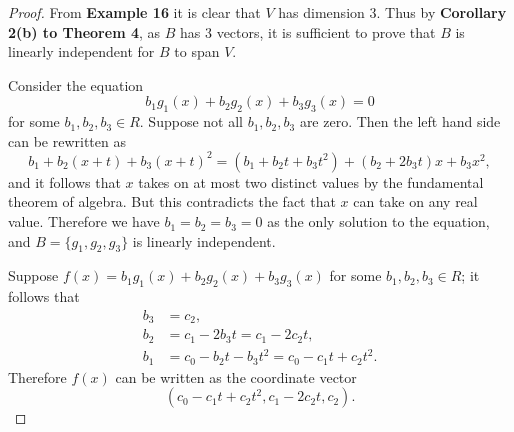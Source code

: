 \documentclass{article}
\begin{document}
\begin{proof}
  From \textbf{Example 16} it is clear that $V$ has dimension 3. Thus by
  \textbf{Corollary 2(b) to Theorem 4}, as $B$ has 3 vectors, it is sufficient
  to prove that $B$ is linearly independent for $B$ to span $V$.

  Consider the equation \[
    b_1g_1(x) + b_2g_2(x) + b_3g_3(x) = 0
  \] for some $b_1, b_2, b_3 \in R$. Suppose not all $b_1, b_2, b_3$ are zero.
  Then the left hand side can be rewritten as \[
    b_1 + b_2(x + t) + b_3(x + t)^2 = (b_1 + b_2t + b_3t^2) + (b_2 + 2b_3t)x +
    b_3x^2,
  \] and it follows that $x$ takes on at most two distinct values by the
  fundamental theorem of algebra. But this contradicts the fact that $x$ can
  take on any real value. Therefore we have $b_1 = b_2 = b_3 = 0$ as the only
  solution to the equation, and $B = \{g_1, g_2, g_3\}$ is linearly independent.

  Suppose $f(x) = b_1g_1(x) + b_2g_2(x) + b_3g_3(x)$ for some $b_1, b_2, b_3 \in
  R$; it follows that
  \begin{align*}
    b_3 &= c_2, \\
    b_2 &= c_1 - 2b_3t = c_1 - 2c_2t, \\
    b_1 &= c_0 - b_2t - b_3t^2 = c_0 - c_1t + c_2t^2.
  \end{align*}
  Therefore $f(x)$ can be written as the coordinate vector \[
    (c_0 - c_1t + c_2t^2, c_1 - 2c_2t, c_2).
  \]
\end{proof}
\end{document}
